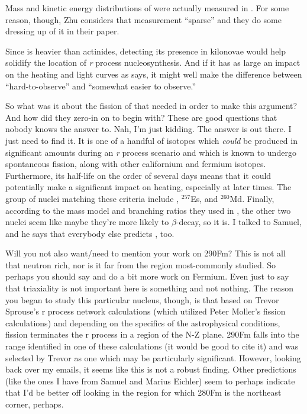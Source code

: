 Mass and kinetic energy distributions of {\Cf} were actually measured in \cite{Brandt1963}. For some reason, though, Zhu considers that measurement ``sparse'' and they do some dressing up of it in their paper.

Since {\Cf} is heavier than actinides, detecting its presence in kilonovae would help solidify the location of \textit{r} process nucleosynthesis. And if it has as large an impact on the heating and light curves as \cite{Zhu2018} says, it might well make the difference between ``hard-to-observe'' and ``somewhat easier to observe.''

So what was it about the fission of {\Cf} that \cite{Zhu2018} needed in order to make this argument? And how did they zero-in on {\Cf} to begin with? These are good questions that nobody knows the answer to. Nah, I'm just kidding. The answer is out there. I just need to find it. It is one of a handful of isotopes which \textit{could} be produced in significant amounts during an \textit{r} process scenario and which is known to undergo spontaneous fission, along with other californium and fermium isotopes. Furthermore, its half-life on the order of several days means that it could potentially make a significant impact on heating, especially at later times. The group of nuclei matching these criteria include {\Cf}, $^{257}$Es, and $^{260}$Md. Finally, according to the mass model and branching ratios they used in \cite{Zhu2018}, the other two nuclei seem like maybe they're more likely to $\beta$-decay, so {\Cf} it is. I talked to Samuel, and he says that everybody else predicts {\Cf}, too.

Will you not also want/need to mention your work on 290Fm? This {\Cf} is not all that neutron rich, nor is it far from the region most-commonly studied. So perhaps you should say and do a bit more work on Fermium. Even just to say that triaxiality is not important here is something and not nothing. The reason you began to study this particular nucleus, though, is that based on Trevor Sprouse's r process network calculations (which utilized Peter Moller's fission calculations) and depending on the specifics of the astrophysical conditions, fission terminates the r process in a region of the N-Z plane. 290Fm falls into the range identified in one of these calculations (it would be good to cite it) and was selected by Trevor as one which may be particularly significant. However, looking back over my emails, it seems like this is not a robust finding. Other predictions (like the ones I have from Samuel and Marius Eichler) seem to perhaps indicate that I'd be better off looking in the region for which 280Fm is the northeast corner, perhaps.


